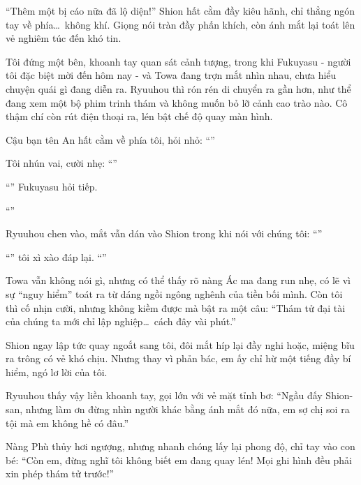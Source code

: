 \documentclass[../main.tex]{subfiles}
\begin{document}
``Thêm một bị cáo nữa đã lộ diện!'' Shion hất cằm đầy kiêu hãnh, chỉ thẳng ngón tay về phía\dots\ không khí. Giọng nói tràn đầy phấn khích, còn ánh mắt lại toát lên vẻ nghiêm túc đến khó tin.

Tôi đứng một bên, khoanh tay quan sát cảnh tượng, trong khi Fukuyasu - người tôi đặc biệt mời đến hôm nay - và Towa đang trợn mắt nhìn nhau, chưa hiểu chuyện quái gì đang diễn ra. Ryuuhou thì rón rén di chuyển ra gần hơn, như thể đang xem một bộ phim trinh thám và không muốn bỏ lỡ cảnh cao trào nào. Cô thậm chí còn rút điện thoại ra, lén bật chế độ quay màn hình.


Cậu bạn tên An hất cằm về phía tôi, hỏi nhỏ: ``''

Tôi nhún vai, cười nhẹ: ``''

``'' Fukuyasu hỏi tiếp.

``''

Ryuuhou chen vào, mắt vẫn dán vào Shion trong khi nói với chúng tôi: ``''

``'' tôi xì xào đáp lại. ``''

Towa vẫn không nói gì, nhưng có thể thấy rõ nàng Ác ma đang run nhẹ, có lẽ vì sự ``nguy hiểm'' toát ra từ dáng ngồi ngông nghênh của tiền bối mình. Còn tôi thì cố nhịn cười, nhưng không kiềm được mà bật ra một câu: ``Thám tử đại tài của chúng ta mới chỉ lập nghiệp\dots\ cách đây vài phút.''

Shion ngay lập tức quay ngoắt sang tôi, đôi mắt híp lại đầy nghi hoặc, miệng bĩu ra trông có vẻ khó chịu. Nhưng thay vì phản bác, em ấy chỉ hừ một tiếng đầy bí hiểm, ngó lơ lời của tôi.

Ryuuhou thấy vậy liền khoanh tay, gọi lớn với vẻ mặt tỉnh bơ: ``Ngầu đấy Shion-san, nhưng làm ơn đừng nhìn người khác bằng ánh mắt đó nữa, em sợ chị soi ra tội mà em không hề có đâu.''

Nàng Phù thủy hơi ngượng, nhưng nhanh chóng lấy lại phong độ, chỉ tay vào con bé: ``Còn em, đừng nghĩ tôi không biết em đang quay lén! Mọi ghi hình đều phải xin phép thám tử trước!''
\end{document}
